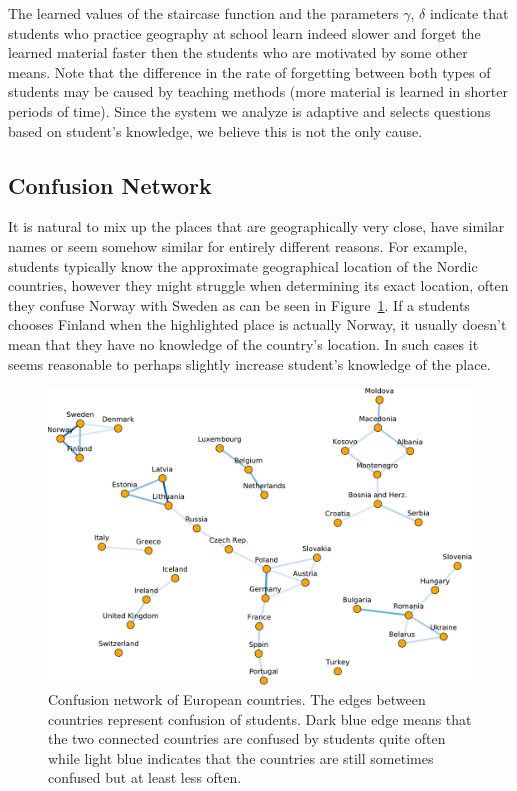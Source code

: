 The learned values of the staircase function and the parameters $\gamma$, $\delta$ indicate that students who practice geography at school learn indeed slower and forget the learned material faster then the students who are motivated by some other means. Note that the difference in the rate of forgetting between both types of students may be caused by teaching methods (more material is learned in shorter periods of time). Since the system we analyze is adaptive and selects questions based on student's knowledge, we believe this is not the only cause.

\subsection{Confusion Network}

It is natural to mix up the places that are geographically very close, have similar names or seem somehow similar for entirely different reasons. For example, students typically know the approximate geographical location of the Nordic countries, however they might struggle when determining its exact location, often they confuse Norway with Sweden as can be seen in Figure~\ref{fig:confusion-network}. If a students chooses Finland when the highlighted place is actually Norway, it usually doesn't mean that they have no knowledge of the country's location. In such cases it seems reasonable to perhaps slightly increase student's knowledge of the place.

\begin{figure}[htbp]
  \centering
  \includegraphics[width=\textwidth]{img/confusion-network}
  \caption{Confusion network of European countries. The edges between countries represent confusion of students. Dark blue edge means that the two connected countries are confused by students quite often while light blue indicates that the countries are still sometimes confused but at least less often.}
  \label{fig:confusion-network}
\end{figure}

